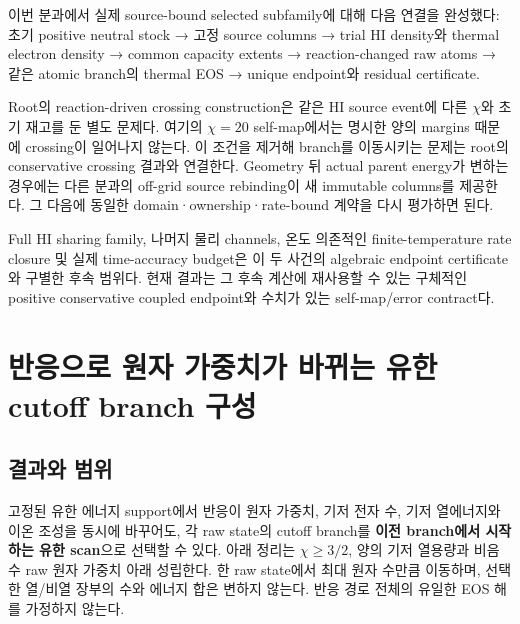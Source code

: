 이번 분과에서 실제 source-bound selected subfamily에 대해 다음 연결을 완성했다: 초기 positive neutral stock → 고정 source columns → trial HI density와 thermal electron density → common capacity extents → reaction-changed raw atoms → 같은 atomic branch의 thermal EOS → unique endpoint와 residual certificate.

Root의 reaction-driven crossing construction은 같은 HI source event에 다른 \(\chi\)와 초기 재고를 둔 별도 문제다. 여기의 \(\chi=20\) self-map에서는 명시한 양의 margins 때문에 crossing이 일어나지 않는다. 이 조건을 제거해 branch를 이동시키는 문제는 root의 conservative crossing 결과와 연결한다. Geometry 뒤 actual parent energy가 변하는 경우에는 다른 분과의 off-grid source rebinding이 새 immutable columns를 제공한다. 그 다음에 동일한 domain·ownership·rate-bound 계약을 다시 평가하면 된다.

Full HI sharing family, 나머지 물리 channels, 온도 의존적인 finite-temperature rate closure 및 실제 time-accuracy budget은 이 두 사건의 algebraic endpoint certificate와 구별한 후속 범위다. 현재 결과는 그 후속 계산에 재사용할 수 있는 구체적인 positive conservative coupled endpoint와 수치가 있는 self-map/error contract다.

\clearpage

\hypertarget{uxbc18uxc751uxc73cuxb85c-uxc6d0uxc790-uxac00uxc911uxce58uxac00-uxbc14uxb00cuxb294-uxc720uxd55c-cutoff-branch-uxad6cuxc131}{%
\section{반응으로 원자 가중치가 바뀌는 유한 cutoff branch 구성}\label{uxbc18uxc751uxc73cuxb85c-uxc6d0uxc790-uxac00uxc911uxce58uxac00-uxbc14uxb00cuxb294-uxc720uxd55c-cutoff-branch-uxad6cuxc131}}

\hypertarget{uxacb0uxacfcuxc640-uxbc94uxc704}{%
\subsection{결과와 범위}\label{uxacb0uxacfcuxc640-uxbc94uxc704}}

고정된 유한 에너지 support에서 반응이 원자 가중치, 기저 전자 수, 기저 열에너지와 이온 조성을 동시에 바꾸어도, 각 raw state의 cutoff branch를 \textbf{이전 branch에서 시작하는 유한 scan}으로 선택할 수 있다. 아래 정리는 \(\chi\ge3/2\), 양의 기저 열용량과 비음수 raw 원자 가중치 아래 성립한다. 한 raw state에서 최대 원자 수만큼 이동하며, 선택한 열/비열 장부의 수와 에너지 합은 변하지 않는다. 반응 경로 전체의 유일한 EOS 해를 가정하지 않는다.

